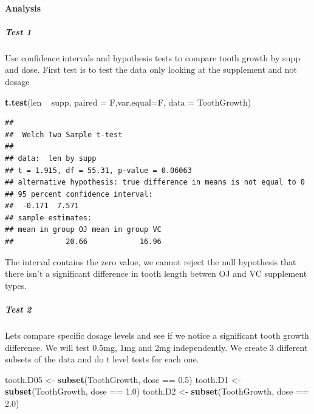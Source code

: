 \documentclass[]{article}
\newenvironment{Shaded}{\begin{snugshade}}{\end{snugshade}}
\newcommand{\KeywordTok}[1]{\textcolor[rgb]{0.13,0.29,0.53}{\textbf{{#1}}}}
\newcommand{\DataTypeTok}[1]{\textcolor[rgb]{0.13,0.29,0.53}{{#1}}}
\newcommand{\FloatTok}[1]{\textcolor[rgb]{0.00,0.00,0.81}{{#1}}}
\newcommand{\StringTok}[1]{\textcolor[rgb]{0.31,0.60,0.02}{{#1}}}
\newcommand{\NormalTok}[1]{{#1}}
\begin{document}
\paragraph{Analysis}\label{analysis}

\subparagraph{Test 1}\label{test-1}

Use confidence intervals and hypothesis tests to compare tooth growth by
supp and dose. First test is to test the data only looking at the
supplement and not dosage

\begin{Shaded}
\begin{Highlighting}[]
\KeywordTok{t.test}\NormalTok{(len ~}\StringTok{ }\NormalTok{supp, }\DataTypeTok{paired =} \NormalTok{F,}\DataTypeTok{var.equal=}\NormalTok{F, }\DataTypeTok{data =} \NormalTok{ToothGrowth)}
\end{Highlighting}
\end{Shaded}

\begin{verbatim}
## 
##  Welch Two Sample t-test
## 
## data:  len by supp
## t = 1.915, df = 55.31, p-value = 0.06063
## alternative hypothesis: true difference in means is not equal to 0
## 95 percent confidence interval:
##  -0.171  7.571
## sample estimates:
## mean in group OJ mean in group VC 
##            20.66            16.96
\end{verbatim}

The interval contains the zero value, we cannot reject the null
hypothesis that there isn't a significant difference in tooth length
betwen OJ and VC supplement types.

\subparagraph{Test 2}\label{test-2}

Lets compare specific dosage levels and see if we notice a significant
tooth growth difference. We will test 0.5mg, 1mg and 2mg independently.
We create 3 different subsets of the data and do t level tests for each
one.

\begin{Shaded}
\begin{Highlighting}[]
\NormalTok{tooth.D05 <-}\StringTok{ }\KeywordTok{subset}\NormalTok{(ToothGrowth, dose ==}\StringTok{ }\FloatTok{0.5}\NormalTok{)}
\NormalTok{tooth.D1 <-}\StringTok{ }\KeywordTok{subset}\NormalTok{(ToothGrowth, dose ==}\StringTok{ }\FloatTok{1.0}\NormalTok{)}
\NormalTok{tooth.D2 <-}\StringTok{ }\KeywordTok{subset}\NormalTok{(ToothGrowth, dose ==}\StringTok{ }\FloatTok{2.0}\NormalTok{)}
\end{Highlighting}
\end{Shaded}
\end{document}

